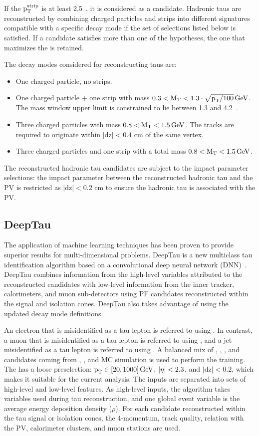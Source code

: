 If the $\text{p}_\text{T}^{\text{strip}}$ is at least 2.5~\GeV, it is considered as a \Pgpz candidate. Hadronic taus are reconstructed by combining charged particles and strips into different signatures compatible with a specific decay mode if the set of selections listed below is satisfied. If a candidate satisfies more than one of the hypotheses, the one that maximizes the \pt is retained.

The decay modes considered for reconstructing taus are:
\begin{itemize}
  \item One charged particle, no strips.
  \item One charged particle + one strip with mass $0.3 < \text{M}_\mathrm{T} < 1.3 \cdot \sqrt{\text{p}_\text{T}/100} \,\text{Ge\hspace{-.08em}V}$. The mass window upper limit is constrained to lie between 1.3 and 4.2~\GeV.
  \item Three charged particles with mass $0.8 < \text{M}_\mathrm{T} < 1.5 \,\text{Ge\hspace{-.08em}V}$. The tracks are required to originate within $|\text{dz}| < 0.4$ cm of the same vertex.
  \item Three charged particles and one strip with a total mass $0.8 < \text{M}_\mathrm{T} < 1.5 \,\text{Ge\hspace{-.08em}V}$.
\end{itemize}

The reconstructed hadronic tau candidates are subject to the impact parameter selections: the impact parameter between the reconstructed hadronic tau and the PV is restricted as $|\text{dz}| < 0.2$ cm to ensure the hadronic tau is associated with the PV.

\subsection{DeepTau}

The application of machine learning techniques has been proven to provide superior results for multi-dimensional problems. DeepTau is a new multiclass tau identification algorithm based on a convolutional deep neural network (DNN)~\cite{CMS-DP-2019-033}. DeepTau combines information from the high-level variables attributed to the reconstructed \tauh candidates with low-level information from the inner tracker, calorimeters, and muon sub-detectors using PF candidates reconstructed within the \tauh signal and isolation cones. DeepTau also takes advantage of using the updated decay mode definitions.

An electron that is misidentified as a tau lepton is referred to using \taue. In contrast, a muon that is misidentified as a tau lepton is referred to using \taum, and a jet misidentified as a tau lepton is referred to using \tauj. A balanced mix of \taue, \taum, \tauh, and \tauj candidates coming from \ttbar, \wjets, and \zjets MC simulation is used to perform the training. The \tauh has a loose preselection: $\text{p}_\text{T} \in [20, 1000] \,\text{Ge\hspace{-.08em}V}$, $\lvert\eta\rvert < 2.3$, and $|\text{dz}| < 0.2$, which makes it suitable for the current analysis. The inputs are separated into sets of high-level and low-level features. As high-level inputs, the algorithm takes variables used during tau reconstruction, and one global event variable is the average energy deposition density ($\rho$). For each candidate reconstructed within the tau signal or isolation cones, the 4-momentum, track quality, relation with the PV, calorimeter clusters, and muon stations are used.

